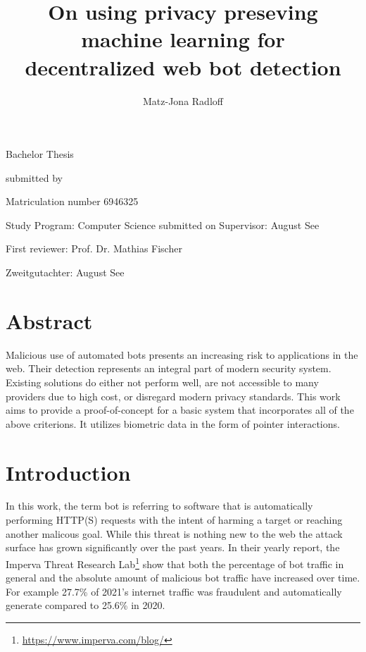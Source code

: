 \documentclass[
    fontsize=12pt,
    headings=small,
    parskip=half,           %
    bibliography=totoc,
    numbers=noenddot,       %
    open=any,               %
    final,                   %
    table
]{scrreprt}
\begin{document}
\title{On using privacy preseving machine learning for\\decentralized web bot detection}
\author{Matz-Jona Radloff}


\begin{titlepage}
\begin{center}\Large
    \vfill
    Bachelor Thesis
    \vfill
    \makeatletter
    {\Large\textsf{\textbf{\@title}}\par}
    \makeatother
    \vfill
    submitted by
    \par\bigskip
    \makeatletter
    {\@author} \par
    \makeatother
    Matriculation number 6946325 \par
    Study Program: Computer Science
    \vfill
    \makeatletter
    submitted on {\@date}
    \makeatother
    \vfill
    Supervisor: August See\par
    First reviewer: Prof. Dr. Mathias Fischer \par
    Zweitgutachter: August See
\end{center}
\end{titlepage}


\chapter*{Abstract}

Malicious use of automated bots presents an increasing risk to applications in the web. Their detection represents an integral part of modern security system. Existing solutions do either not perform well, are not accessible to many providers due to high cost, or disregard modern privacy standards. This work aims to provide a proof-of-concept for a basic system that incorporates all of the above criterions. It utilizes biometric data in the form of pointer interactions.

\tableofcontents

\chapter{Introduction}

In this work, the term bot is referring to software that is automatically performing HTTP(S) requests with the intent of harming a target or reaching another malicous goal. While this threat is nothing new to the web the attack surface has grown significantly over the past years. In their yearly report, the Imperva Threat Research Lab\footnote{\url{https://www.imperva.com/blog/}} show that both the percentage of bot traffic in general and the absolute amount of malicious bot traffic have increased over time.\cite{BAD_BOT_REPORT2020,BAD_BOT_REPORT2021,BAD_BOT_REPORT2022} For example 27.7\% of 2021's internet traffic was fraudulent and automatically generate compared to 25.6\% in 2020.
\end{document}
